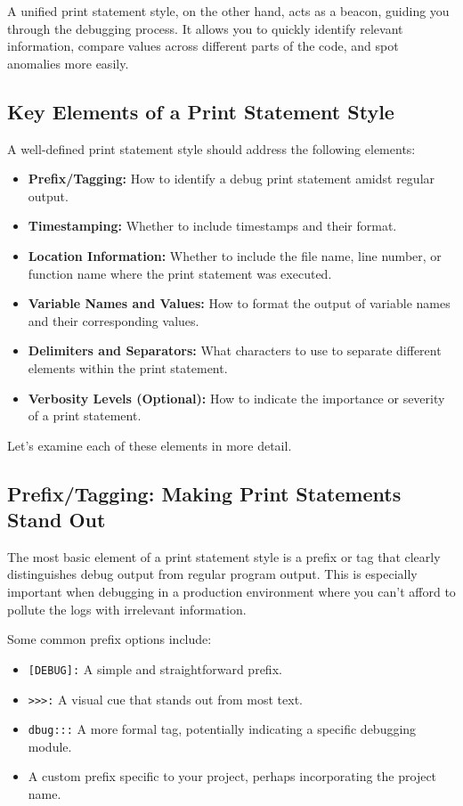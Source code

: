 \documentclass{article}
\begin{document}
A unified print statement style, on the other hand, acts as a beacon, guiding you through the debugging process. It allows you to quickly identify relevant information, compare values across different parts of the code, and spot anomalies more easily.

\subsection*{Key Elements of a Print Statement Style}

A well-defined print statement style should address the following elements:

\begin{itemize}
    \item \textbf{Prefix/Tagging:} How to identify a debug print statement amidst regular output.
    \item \textbf{Timestamping:} Whether to include timestamps and their format.
    \item \textbf{Location Information:} Whether to include the file name, line number, or function name where the print statement was executed.
    \item \textbf{Variable Names and Values:} How to format the output of variable names and their corresponding values.
    \item \textbf{Delimiters and Separators:} What characters to use to separate different elements within the print statement.
    \item \textbf{Verbosity Levels (Optional):} How to indicate the importance or severity of a print statement.
\end{itemize}

Let's examine each of these elements in more detail.

\subsection*{Prefix/Tagging: Making Print Statements Stand Out}

The most basic element of a print statement style is a prefix or tag that clearly distinguishes debug output from regular program output.  This is especially important when debugging in a production environment where you can't afford to pollute the logs with irrelevant information.

Some common prefix options include:

\begin{itemize}
    \item \texttt{[DEBUG]:}  A simple and straightforward prefix.
    \item \texttt{>>>:} A visual cue that stands out from most text.
    \item \texttt{dbug:::}  A more formal tag, potentially indicating a specific debugging module.
    \item A custom prefix specific to your project, perhaps incorporating the project name.
\end{itemize}
\end{document}
